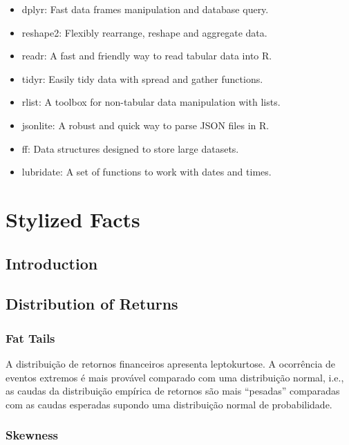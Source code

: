 \documentclass[]{book}
\providecommand{\tightlist}{%
  \setlength{\itemsep}{0pt}\setlength{\parskip}{0pt}}
\theoremstyle{definition}
\theoremstyle{definition}
\theoremstyle{definition}
\theoremstyle{remark}
\begin{document}
\begin{itemize}
\tightlist
\item
  dplyr: Fast data frames manipulation and database query.
\item
  reshape2: Flexibly rearrange, reshape and aggregate data.
\item
  readr: A fast and friendly way to read tabular data into R.
\item
  tidyr: Easily tidy data with spread and gather functions.
\item
  rlist: A toolbox for non-tabular data manipulation with lists.
\item
  jsonlite: A robust and quick way to parse JSON files in R.
\item
  ff: Data structures designed to store large datasets.
\item
  lubridate: A set of functions to work with dates and times.
\end{itemize}

\chapter{Stylized Facts}\label{stylized-facts}

\section{Introduction}\label{introduction}

\section{Distribution of Returns}\label{distribution-of-returns}

\subsection{Fat Tails}\label{fat-tails}

A distribuição de retornos financeiros apresenta leptokurtose. A
ocorrência de eventos extremos é mais provável comparado com uma
distribuição normal, i.e., as caudas da distribuição empírica de
retornos são mais ``pesadas'' comparadas com as caudas esperadas supondo
uma distribuição normal de probabilidade.

\subsection{Skewness}\label{skewness}
\end{document}
